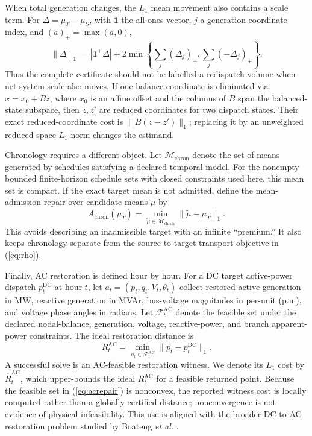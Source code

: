\documentclass[journal]{IEEEtran}
\newcommand{\Mcal}{\mathcal{M}}
\begin{document}
When total generation changes, the $L_1$ mean movement also contains a scale term. For $\Delta=\mu_T-\mu_S$, with $\mathbf1$ the all-ones vector, $j$ a generation-coordinate index, and $(a)_+=\max(a,0)$,
\begin{equation}
\|\Delta\|_1=|\mathbf 1^\top\Delta|+2\min\left\{\sum_j(\Delta_j)_+,\sum_j(-\Delta_j)_+\right\}.
\label{eq:scale}
\end{equation}
Thus the complete certificate should not be labelled a redispatch volume when net system scale also moves. If one balance coordinate is eliminated via $x=x_0+Bz$, where $x_0$ is an affine offset and the columns of $B$ span the balanced-state subspace, then $z,z'$ are reduced coordinates for two dispatch states. Their exact reduced-coordinate cost is $\|B(z-z')\|_1$; replacing it by an unweighted reduced-space $L_1$ norm changes the estimand.

Chronology requires a different object. Let $\Mcal_{\mathrm{chron}}$ denote the set of means generated by schedules satisfying a declared temporal model. For the nonempty bounded finite-horizon schedule sets with closed constraints used here, this mean set is compact. If the exact target mean is not admitted, define the mean-admission repair over candidate means $\widetilde\mu$ by
\begin{equation}
A_{\mathrm{chron}}(\mu_T)=\min_{\widetilde\mu\in\Mcal_{\mathrm{chron}}}\|\widetilde\mu-\mu_T\|_1.
\label{eq:chronrepair}
\end{equation}
This avoids describing an inadmissible target with an infinite ``premium.'' It also keeps chronology separate from the source-to-target transport objective in (\ref{eq:rho}).

Finally, AC restoration is defined hour by hour. For a DC target active-power dispatch $p_t^{\mathrm{DC}}$ at hour $t$, let $a_t=(\widetilde p_t,q_t,V_t,\theta_t)$ collect restored active generation in MW, reactive generation in MVAr, bus-voltage magnitudes in per-unit (p.u.), and voltage phase angles in radians. Let $\mathcal F_t^{\mathrm{AC}}$ denote the feasible set under the declared nodal-balance, generation, voltage, reactive-power, and branch apparent-power constraints. The ideal restoration distance is
\begin{equation}
R_t^{\mathrm{AC}}=\min_{a_t\in\mathcal F_t^{\mathrm{AC}}}\|\widetilde p_t-p_t^{\mathrm{DC}}\|_1.
\label{eq:acrepair}
\end{equation}
A successful solve is an AC-feasible restoration witness. We denote its $L_1$ cost by $\widehat R_t^{\mathrm{AC}}$, which upper-bounds the ideal $R_t^{\mathrm{AC}}$ for a feasible returned point. Because the feasible set in (\ref{eq:acrepair}) is nonconvex, the reported witness cost is locally computed rather than a globally certified distance; nonconvergence is not evidence of physical infeasibility. This use is aligned with the broader DC-to-AC restoration problem studied by Boateng \emph{et al.} \cite{Boateng2027}.
\end{document}
